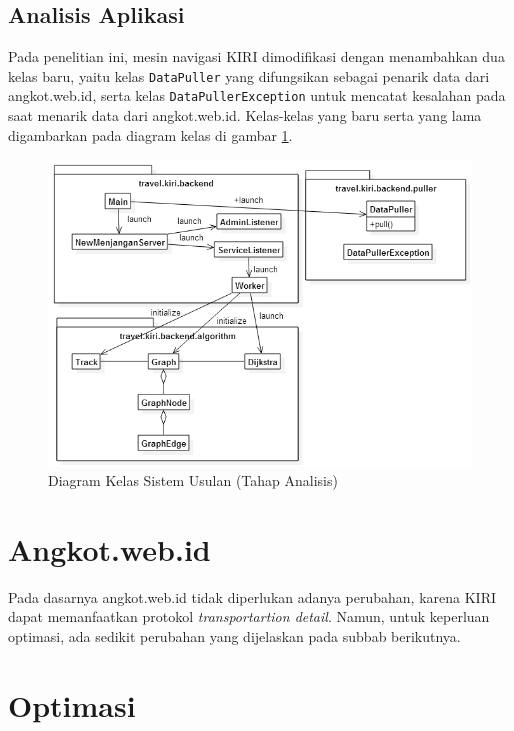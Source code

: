 \subsection{Analisis Aplikasi}

Pada penelitian ini, mesin navigasi KIRI dimodifikasi dengan menambahkan dua kelas baru, yaitu kelas \verb/DataPuller/ yang difungsikan sebagai penarik data dari angkot.web.id, serta kelas \verb/DataPullerException/ untuk mencatat kesalahan pada saat menarik data dari angkot.web.id. Kelas-kelas yang baru serta yang lama digambarkan pada diagram kelas di gambar \ref{fig:3_diagram_kelas_sistem_usulan}.

\begin{figure}
	\centering
	\includegraphics[scale=0.5]{Gambar/3_diagram_kelas_sistem_usulan}
	\caption{Diagram Kelas Sistem Usulan (Tahap Analisis)} 
	\label{fig:3_diagram_kelas_sistem_usulan}
\end{figure}

\section{Angkot.web.id}

Pada dasarnya angkot.web.id tidak diperlukan adanya perubahan, karena KIRI dapat memanfaatkan protokol \textit{transportartion detail}. Namun, untuk keperluan optimasi, ada sedikit perubahan yang dijelaskan pada subbab berikutnya.

\section{Optimasi}

